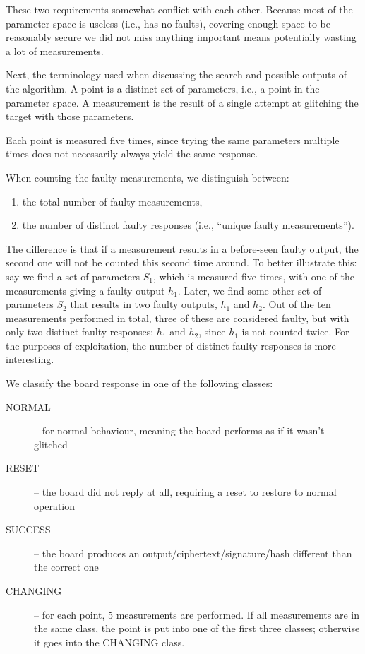 \documentclass[times, utf8, diplomski]{fer}
\begin{document}
These two requirements somewhat conflict with each other. Because most of the
parameter space is useless (i.e., has no faults), covering enough space to be
reasonably secure we did not miss anything important means potentially wasting
a lot of measurements.

Next, the terminology used when discussing the search and possible outputs of the algorithm.
A point is a distinct set of parameters, i.e., a point in the parameter space.
A measurement is the result of a single attempt at glitching the target with those parameters.

Each point is measured five times, since trying the same parameters multiple
times does not necessarily always yield the same response.

When counting the faulty measurements, we distinguish between:
\begin{enumerate}
    \item the total number of faulty measurements,
    \item the number of distinct faulty responses (i.e., ``unique faulty measurements'').
\end{enumerate}

The difference is that if a measurement results in a before-seen faulty output,
the second one will not be counted this second time around.
To better illustrate this: say we find a set of parameters $S_1$, which is
measured five times, with one of the measurements giving a faulty output $h_1$.
Later, we find some other set of parameters $S_2$ that results in two faulty
outputs, $h_1$ and $h_2$. Out of the ten measurements performed in total, three
of these are considered faulty, but with only two distinct faulty responses:
$h_1$ and $h_2$, since $h_1$ is not counted twice.
For the purposes of exploitation, the number of distinct faulty responses is
more interesting.

We classify the board response in one of the following classes:
\begin{description}
    \item[NORMAL]   -- for normal behaviour, meaning the board performs as if it wasn't glitched
    \item[RESET]    -- the board did not reply at all, requiring a reset to restore to normal operation
    \item[SUCCESS]  -- the board produces an output/ciphertext/signature/hash different than the correct one
    \item[CHANGING] -- for each point, 5 measurements are performed. If all measurements are in the
                       same class, the point is put into one of the first three classes; otherwise
                       it goes into the CHANGING class.
\end{description}
\end{document}
